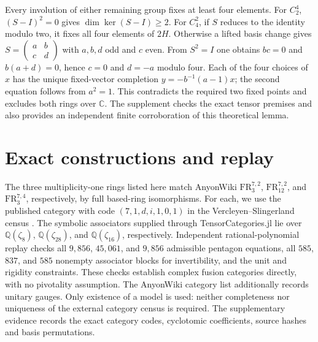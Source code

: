\documentclass[11pt]{article}
\newcommand{\C}{\mathbb C}
\begin{document}
Every involution of either remaining group fixes at least four elements.
For $C_2^4$, $(S-I)^2=0$ gives $\dim\ker(S-I)\geq2$.
For $C_4^2$, if $S$ reduces to the identity modulo two, it fixes all
four elements of $2H$. Otherwise a lifted basis change gives
$S=\left(\begin{smallmatrix}a&b\\c&d\end{smallmatrix}\right)$ with
$a,b,d$ odd and $c$ even. From $S^2=I$ one obtains
$bc=0$ and $b(a+d)=0$, hence $c=0$ and $d=-a$ modulo four.
Each of the four choices of $x$ has the unique fixed-vector completion
$y=-b^{-1}(a-1)x$; the second equation follows from $a^2=1$.
This contradicts the required two fixed points and excludes both rings
over $\C$. The supplement checks the exact tensor premises and also
provides an independent finite corroboration of this theoretical lemma.















\section{Exact constructions and replay}
The three multiplicity-one rings listed here match AnyonWiki
$\mathrm{FR}^{7,2}_3$, $\mathrm{FR}^{7,2}_{12}$, and
$\mathrm{FR}^{7,4}_3$, respectively, by full based-ring isomorphisms.
For each, we use the published category with code $(7,1,d,i,1,0,1)$
in the Vercleyen--Slingerland census \cite{AnyonWiki2026}.
The symbolic associators supplied through TensorCategories.jl lie over
$\mathbb Q(\zeta_8)$, $\mathbb Q(\zeta_{28})$, and
$\mathbb Q(\zeta_{16})$, respectively. Independent rational-polynomial
replay checks all $9{,}856$, $45{,}061$, and $9{,}856$ admissible
pentagon equations, all $585$, $837$, and $585$ nonempty associator
blocks for invertibility, and the unit and rigidity constraints.
These checks establish complex fusion categories directly, with no
pivotality assumption. The AnyonWiki category list additionally records
unitary gauges. Only existence of a model is used: neither completeness
nor uniqueness of the external category census is required.
The supplementary evidence records the exact category codes,
cyclotomic coefficients, source hashes and basis permutations.
\end{document}
